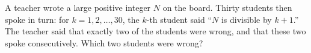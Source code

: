 A teacher wrote a large positive integer $N$ on the board. Thirty students then spoke in turn: for $k=1,2,\dots,30$, the $k$-th student said ``$N$ is divisible by $k+1$.'' The teacher said that exactly two of the students were wrong, and that these two spoke consecutively. Which two students were wrong?
